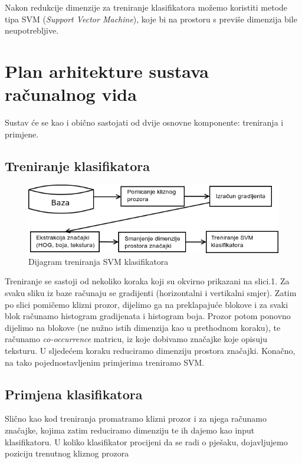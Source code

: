 \documentclass[seminar]{fer}
\begin{document}
Nakon redukcije dimenzije za treniranje klasifikatora možemo koristiti metode tipa SVM (\emph{Support Vector Machine}), koje bi na prostoru s 
previše dimenzija bile neupotrebljive.


\section{Plan arhitekture sustava računalnog vida}

Sustav će se kao i obično sastojati od dvije osnovne komponente: treniranja i primjene.

\subsection{Treniranje klasifikatora}

\begin{figure}[h!]
\center
\includegraphics[scale=0.7]{img/treniranje.png}
\caption{Dijagram treniranja SVM klasifikatora}
\label{primjer_klasifikacije}
\end{figure}

Treniranje se sastoji od nekoliko koraka koji su okvirno prikazani na slici.1. 
Za svaku sliku iz baze računaju se gradijenti (horizontalni i vertikalni smjer). Zatim po slici pomičemo
klizni prozor, dijelimo ga na preklapajuće blokove i za svaki blok računamo histogram gradijenata i histogram boja. Prozor potom ponovno dijelimo
na blokove (ne nužno istih dimenzija kao u prethodnom koraku), te računamo \emph{co-occurrence} matricu, iz koje dobivamo značajke koje opisuju
teksturu. U sljedećem koraku reduciramo dimenziju prostora značajki. Konačno, na tako pojednostavljenim primjerima treniramo SVM.


\subsection{Primjena klasifikatora}


Slično kao kod treniranja promatramo klizni prozor i za njega računamo značajke, kojima zatim reduciramo dimenziju te ih dajemo kao input
klasifikatoru. U koliko klasifikator procijeni da se radi o pješaku, dojavljujemo poziciju trenutnog kliznog prozora





\end{document}
